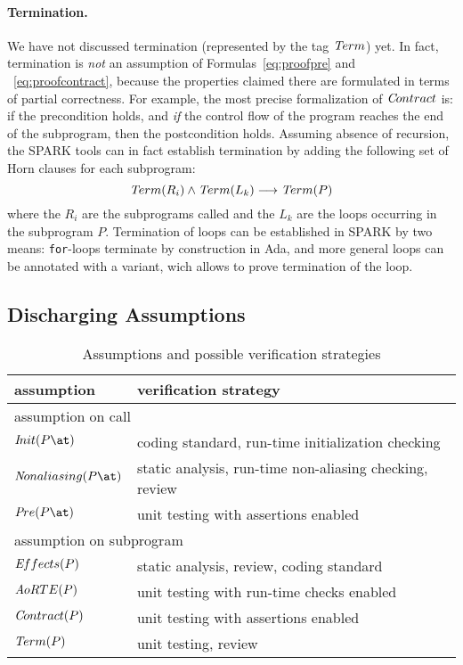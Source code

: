 \documentclass{llncs}
\newcommand{\spark}{SPARK\xspace}
\begin{document}
\paragraph{Termination.} We have not discussed termination (represented by the
tag ${\textit Term}$) yet. In fact, termination is {\em not} an assumption of
Formulas~\ref{eq:proofpre} and ~\ref{eq:proofcontract}, because the properties
claimed there are formulated in terms of partial correctness. For example, the
most precise formalization of ${\textit Contract}$ is: if the precondition
holds, and {\em if} the control flow of the program reaches the end of the
subprogram, then the postcondition holds. Assuming absence of recursion, the
\spark tools can in fact establish termination by adding the following set of
Horn clauses for each subprogram: \begin{equation*} {\textit Term}(R_i) \wedge
{\textit Term}(L_k) \longrightarrow {\textit Term}(P) \label{eq:term}
\end{equation*} where the $R_i$ are the subprograms called and the $L_k$ are
the loops occurring in the subprogram $P$. Termination of loops can be
established in \spark by two means: \texttt{for}-loops terminate by
construction in Ada, and more general loops can be annotated with a variant,
wich allows to prove termination of the loop.

\subsection{Discharging Assumptions}

\begin{table}[t]
   \begin{center}
   \begin{tabular*}{\textwidth}{p{}|p{}}
   \hline
   assumption & verification strategy \\
   \hline
   \multicolumn{2}{l}{assumption on call} \\
   \hline
   ${\textit Init}(P\at)$ & coding standard, run-time initialization checking  \\
   ${\textit Nonaliasing}(P\at)$  & static analysis, run-time non-aliasing checking, review \\
   ${\textit Pre}(P\at)$  & unit testing with assertions enabled \\
   \hline
   \multicolumn{2}{l}{assumption on subprogram} \\
   \hline
   ${\textit Effects}(P)$ & static analysis, review, coding standard \\
   ${\textit AoRTE}(P)$ & unit testing with run-time checks enabled \\
   ${\textit Contract}(P)$ & unit testing with assertions enabled\\
   ${\textit Term}(P)$ & unit testing, review \\
   \end{tabular*}
   \end{center}
   \caption{Assumptions and possible verification strategies}
   \label{table:assumptions}
\end{table}
\end{document}

